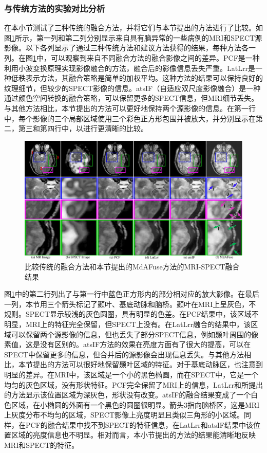 \subsubsection{与传统方法的实验对比分析}
在本小节测试了三种传统的融合方法，并将它们与本节提出的方法进行了比较。如图\ref{paper2d2roi}所示，第一列和第二列分别显示来自具有脑异常的一些病例的MRI和SPECT源影像。以下各列显示了通过三种传统方法和建议方法获得的结果，每种方法各一列。在图\ref{paper2d2roi}中，可以观察到来自不同融合方法的融合影像之间的差异。PCF是一种利用小波变换原理实现影像融合的方法，融合后的影像信息丢失严重。LatLrr是一种低秩表示方法，其融合策略是简单的加权平均。这种方法的结果可以保持良好的纹理细节，但较少的SPECT影像的信息。atsIF（自适应双尺度影像融合）\cite{2020An}是一种通过颜色空间转换的融合策略，可以保留更多的SPECT信息，但MRI细节丢失。与其他方法相比，本节提出的方法可以更好地保持两个源影像的信息。在第一行中，每个影像的三个局部区域使用三个彩色正方形包围并被放大，并分别显示在第二，第三和第四行中，以进行更清晰的比较。

   \begin{figure}[ht]
      \centering
      \includegraphics[width=0.9\linewidth]{figs/paper2d2_10_roi.pdf}
      \caption{比较传统的融合方法和本节提出的MdAFuse方法的MRI-SPECT融合结果}\label{paper2d2roi}
    \end{figure}
图\ref{paper2d2roi}中的第二行列出了与第一行中蓝色正方形内的部分相对应的放大影像。在最后一列，本节用三个箭头标记了颞叶、基底动脉和脑桥。颞叶在MRI上呈灰色，不规则。SPECT显示较浅的灰色圆圈，具有明显的色差。在PCF结果中，该区域不明显，MRI上的特征完全保留，但SPECT上没有。在LatLrr融合的结果中，该区域可以保留两个源影像的信息，但也丢失了部分SPECT信息，例如颞叶周围的像素值，这是没有区别的。atsIF方法的效果在亮度方面有了很大的提高，可以在SPECT中保留更多的信息，但合并后的源影像会出现信息丢失。与其他方法相比，本节提出的方法可以很好地保留颞叶区域的特征。对于基底动脉区，也注意到明显的差异。在MRI中，该区域是一个小的黑色椭圆，而在SPECT中，它是一个均匀的灰色区域，没有形状特征。PCF完全保留了MRI上的信息，LatLrr和所提出的方法显示该位置区域为深灰色，形状没有改变。atsIF的融合结果变成了一个白色区域，在小椭圆的外面有一个黑色的圆圈很明显。箭头3指向脑桥区，这是MRI上灰度分布不均匀的区域，SPECT影像上亮度明显且类似三角形的小区域。同样，在PCF的融合结果中找不到SPECT的特征信息，在LatLrr和atsIF结果中该位置区域的亮度信息也不明显。相对而言，本小节提出的方法的结果能清晰地反映MRI和SPECT的特征。

